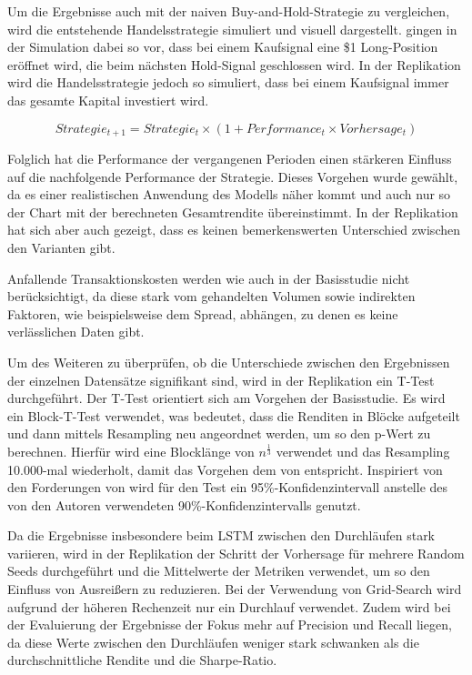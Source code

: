 \documentclass[a4paper, 12pt]{article}
\begin{document}
Um die Ergebnisse auch mit der naiven Buy-and-Hold-Strategie zu vergleichen, wird die entstehende Handelsstrategie simuliert und visuell dargestellt.
\citeauthor{Goutte2023} gingen in der Simulation dabei so vor, dass bei einem Kaufsignal eine \$1 Long-Position eröffnet wird, die beim nächsten Hold-Signal geschlossen wird.
In der Replikation wird die Handelsstrategie jedoch so simuliert, dass bei einem Kaufsignal immer das gesamte Kapital investiert wird.

\begin{equation}
	Strategie_{t+1} = Strategie_t \times (1 + Performance_t \times Vorhersage_t)
\end{equation}

Folglich hat die Performance der vergangenen Perioden einen stärkeren Einfluss auf die nachfolgende Performance der Strategie.
Dieses Vorgehen wurde gewählt, da es einer realistischen Anwendung des Modells näher kommt und auch nur so der Chart mit der berechneten Gesamtrendite übereinstimmt.
In der Replikation hat sich aber auch gezeigt, dass es keinen bemerkenswerten Unterschied zwischen den Varianten gibt.

Anfallende Transaktionskosten werden wie auch in der Basisstudie nicht berücksichtigt, da diese stark vom gehandelten Volumen sowie indirekten Faktoren, wie beispielsweise dem Spread, abhängen, zu denen es keine verlässlichen Daten gibt.

Um des Weiteren zu überprüfen, ob die Unterschiede zwischen den Ergebnissen der einzelnen Datensätze signifikant sind, wird in der Replikation ein T-Test durchgeführt.
Der T-Test orientiert sich am Vorgehen der Basisstudie.
Es wird ein Block-T-Test verwendet, was bedeutet, dass die Renditen in Blöcke aufgeteilt und dann mittels Resampling neu angeordnet werden, um so den p-Wert zu berechnen.
Hierfür wird eine Blocklänge von $n^{\frac{1}{3}}$ verwendet und das Resampling 10.000-mal wiederholt, damit das Vorgehen dem von \citeauthor{Goutte2023} entspricht.
Inspiriert von den Forderungen von \textcite{Harvey2016} wird für den Test ein 95\%-Konfidenzintervall anstelle des von den Autoren verwendeten 90\%-Konfidenzintervalls genutzt.

Da die Ergebnisse insbesondere beim LSTM zwischen den Durchläufen stark variieren, wird in der Replikation der Schritt der Vorhersage für mehrere Random Seeds durchgeführt und die Mittelwerte der Metriken verwendet, um so den Einfluss von Ausreißern zu reduzieren.
Bei der Verwendung von Grid-Search wird aufgrund der höheren Rechenzeit nur ein Durchlauf verwendet.
Zudem wird bei der Evaluierung der Ergebnisse der Fokus mehr auf Precision und Recall liegen, da diese Werte zwischen den Durchläufen weniger stark schwanken als die durchschnittliche Rendite und die Sharpe-Ratio.
\end{document}
